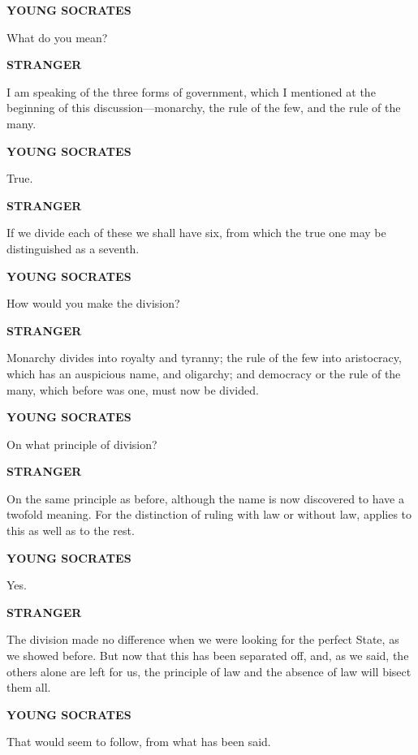 \documentclass[11pt,letter]{article}
\begin{document}
\par \textbf{YOUNG SOCRATES}
\par   What do you mean?

\par \textbf{STRANGER}
\par   I am speaking of the three forms of government, which I mentioned at the beginning of this discussion—monarchy, the rule of the few, and the rule of the many.

\par \textbf{YOUNG SOCRATES}
\par   True.

\par \textbf{STRANGER}
\par   If we divide each of these we shall have six, from which the true one may be distinguished as a seventh.

\par \textbf{YOUNG SOCRATES}
\par   How would you make the division?

\par \textbf{STRANGER}
\par   Monarchy divides into royalty and tyranny; the rule of the few into aristocracy, which has an auspicious name, and oligarchy; and democracy or the rule of the many, which before was one, must now be divided.

\par \textbf{YOUNG SOCRATES}
\par   On what principle of division?

\par \textbf{STRANGER}
\par   On the same principle as before, although the name is now discovered to have a twofold meaning. For the distinction of ruling with law or without law, applies to this as well as to the rest.

\par \textbf{YOUNG SOCRATES}
\par   Yes.

\par \textbf{STRANGER}
\par   The division made no difference when we were looking for the perfect State, as we showed before. But now that this has been separated off, and, as we said, the others alone are left for us, the principle of law and the absence of law will bisect them all.

\par \textbf{YOUNG SOCRATES}
\par   That would seem to follow, from what has been said.
\end{document}
